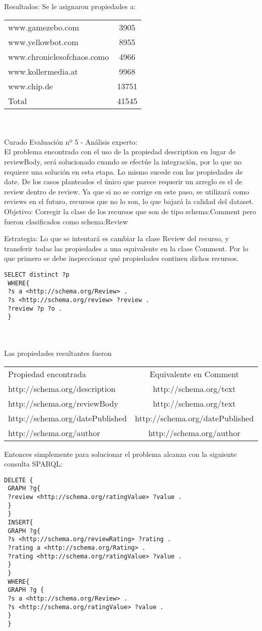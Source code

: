 Resultados:
Se le asignaron propiedades a:
\begin{tabular}{| l | c |}
 www.gamezebo.com & 3905\\
 www.yellowbot.com & 8955\\
 www.chroniclesofchaos.como & 4966\\
 www.kollermedia.at & 9968\\
 www.chip.de & 13751\\
 Total & 41545
\end{tabular}\\
\\
Curado Evaluación nº 5 - Análisis experto:
\\
El problema encontrado con el uso de la propiedad description en lugar de reviewBody, será solucionado cuando se efectúe la integración, 
por lo que no requiere una solución en esta etapa. Lo mismo sucede con las propiedades de date.
De los casos planteados el único que parece requerir un arreglo es el de review dentro de review. Ya que si no se corrige en este paso, 
se utilizará como reviews en el futuro, recursos que no lo son, lo que bajará la calidad del dataset.
\\
Objetivo:
Corregir la clase de los recursos que son de tipo schema:Comment pero fueron clasificados como schema:Review

Estrategia: 
Lo que se intentará es cambiar la clase Review del recurso, y transferir todas las propiedades a una equivalente en la clase Comment.
Por lo que primero se debe inspeccionar qué propiedades continen dichos recursos.

\begin{lstlisting}[frame=single]
 SELECT distinct ?p
 WHERE{
 ?s a <http://schema.org/Review> .
 ?s <http://schema.org/review> ?review .
 ?review ?p ?o .
 }
\end{lstlisting}\\
\\
Las propiedades resultantes fueron
\begin{tabular}{| l | c |}
Propiedad encontrada & Equivalente en Comment\\
http://schema.org/description & http://schema.org/text \\
http://schema.org/reviewBody & http://schema.org/text \\
http://schema.org/datePublished & http://schema.org/datePublished \\
http://schema.org/author & http://schema.org/author
\end{tabular}

Entonces simplemente para solucionar el problema alcanza con la siguiente consulta SPARQL:\\
\begin{lstlisting}[frame=single]
 DELETE { 
 GRAPH ?g{ 
 ?review <http://schema.org/ratingValue> ?value . 
 } 
 } 
 INSERT{ 
 GRAPH ?g{ 
 ?s <http://schema.org/reviewRating> ?rating . 
 ?rating a <http://schema.org/Rating> . 
 ?rating <http://schema.org/ratingValue> ?value . 
 }
 }
 WHERE{
 GRAPH ?g {
 ?s a <http://schema.org/Review> .
 ?s <http://schema.org/ratingValue> ?value .
 }
 }
\end{lstlisting}\\

